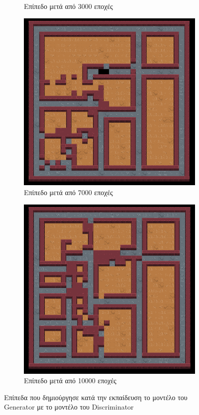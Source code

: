 \begin{figure}[H]
\begin{subfigure}{.5\textwidth}
  \caption{Επίπεδο μετά από 3000 εποχές}
  \label{fig:sfig2}
\end{subfigure}
\begin{subfigure}{.5\textwidth}
  \centering
  \includegraphics[width=.8\linewidth]{../images/result_images/cnn-gan/combined_7000.png}
  \caption{Επίπεδο μετά από 7000 εποχές}
  \label{fig:sfig2}
\end{subfigure}
\begin{subfigure}{.5\textwidth}
  \centering
  \includegraphics[width=.8\linewidth]{../images/result_images/cnn-gan/combined_10000.png}
  \caption{Επίπεδο μετά από 10000 εποχές}
  \label{fig:sfig2}
\end{subfigure}
\caption{Επίπεδα που δημιούργησε κατά την εκπαίδευση το μοντέλο του Generator με το μοντέλο του Discriminator}
\label{fig:fig}
\end{figure}

